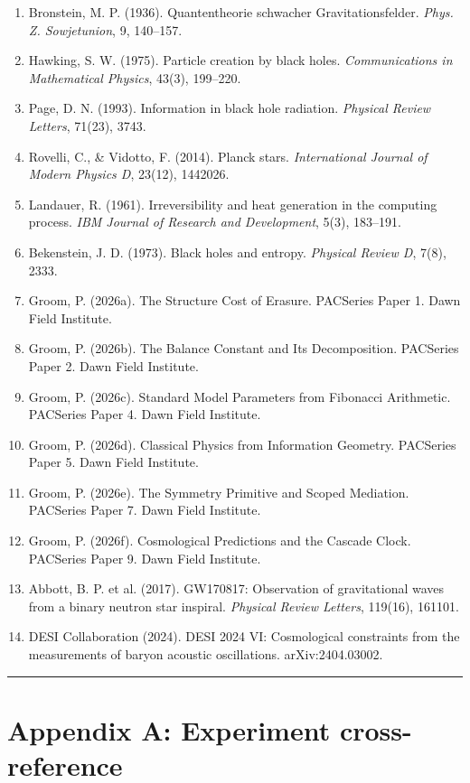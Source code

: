 \documentclass[11pt,a4paper]{article}
\providecommand{\tightlist}{\setlength{\itemsep}{0pt}\setlength{\parskip}{0pt}}
\begin{document}
\begin{enumerate}\tightlist
\item Bronstein, M. P. (1936). Quantentheorie schwacher Gravitationsfelder. \emph{Phys. Z. Sowjetunion}, 9, 140–157.
\item Hawking, S. W. (1975). Particle creation by black holes. \emph{Communications in Mathematical Physics}, 43(3), 199–220.
\item Page, D. N. (1993). Information in black hole radiation. \emph{Physical Review Letters}, 71(23), 3743.
\item Rovelli, C., \& Vidotto, F. (2014). Planck stars. \emph{International Journal of Modern Physics D}, 23(12), 1442026.
\item Landauer, R. (1961). Irreversibility and heat generation in the computing process. \emph{IBM Journal of Research and Development}, 5(3), 183–191.
\item Bekenstein, J. D. (1973). Black holes and entropy. \emph{Physical Review D}, 7(8), 2333.
\item Groom, P. (2026a). The Structure Cost of Erasure. PACSeries Paper 1. Dawn Field Institute.
\item Groom, P. (2026b). The Balance Constant and Its Decomposition. PACSeries Paper 2. Dawn Field Institute.
\item Groom, P. (2026c). Standard Model Parameters from Fibonacci Arithmetic. PACSeries Paper 4. Dawn Field Institute.
\item Groom, P. (2026d). Classical Physics from Information Geometry. PACSeries Paper 5. Dawn Field Institute.
\item Groom, P. (2026e). The Symmetry Primitive and Scoped Mediation. PACSeries Paper 7. Dawn Field Institute.
\item Groom, P. (2026f). Cosmological Predictions and the Cascade Clock. PACSeries Paper 9. Dawn Field Institute.
\item Abbott, B. P. et al. (2017). GW170817: Observation of gravitational waves from a binary neutron star inspiral. \emph{Physical Review Letters}, 119(16), 161101.
\item DESI Collaboration (2024). DESI 2024 VI: Cosmological constraints from the measurements of baryon acoustic oscillations. arXiv:2404.03002.
\end{enumerate}

\begin{center}\rule{0.5\linewidth}{0.4pt}\end{center}

\section*{Appendix A: Experiment cross-reference}
\end{document}
